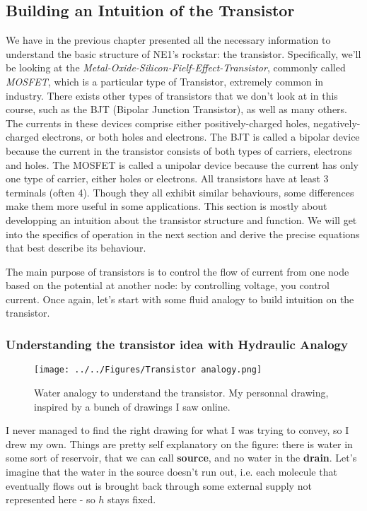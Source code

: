 \subsection{Building an Intuition of the Transistor}

We have in the previous chapter presented all the necessary information to understand the basic structure of NE1's rockstar: the transistor. Specifically, we'll be looking at the \textit{Metal-Oxide-Silicon-Fielf-Effect-Transistor}, commonly called \textit{MOSFET}, which is a particular type of Transistor, extremely common in industry. There exists other types of transistors that we don't look at in this course, such as the BJT (Bipolar Junction Transistor), as well as many others. The currents in these devices comprise either positively-charged holes, negatively-charged electrons, or both holes and electrons. The BJT is called a bipolar device because the current in the transistor consists of both types of carriers, electrons and holes. The MOSFET is called a unipolar device because the current has only one type of carrier, either holes or electrons.
All transistors have at least 3 terminals (often 4). Though they all exhibit similar behaviours, some differences make them more useful in some applications. This section is mostly about developping an intuition about the transistor structure and function. We will get into the specifics of operation in the next section and derive the precise equations that best describe its behaviour.  

The main purpose of transistors is to control the flow of current from one node based on the potential at another node: by controlling voltage, you control current. Once again, let's start with some fluid analogy to build intuition on the transistor. 

\subsubsection{Understanding the transistor idea with Hydraulic Analogy}

\begin{figure}[H]
    \centering
    \texttt{[image: ../../Figures/Transistor analogy.png]}
    \caption{Water analogy to understand the transistor. My personnal drawing, inspired by a bunch of drawings I saw online.}
    \label{fig:Transistor analogy}
\end{figure}

I never managed to find the right drawing for what I was trying to convey, so I drew my own.
Things are pretty self explanatory on the figure: there is water in some sort of reservoir, that we can call \textbf{source}, and no water in the \textbf{drain}. Let's imagine that the water in the source doesn't run out, i.e. each molecule that eventually flows out is brought back through some external supply not represented here - so $h$ stays fixed.

